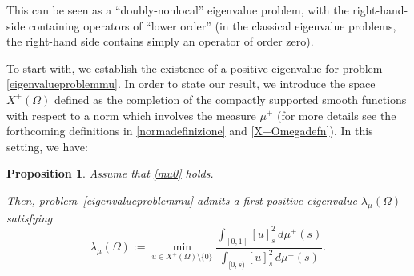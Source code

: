 \documentclass[12pt,a4paper,intlimits,sumlimits]{amsart}
\theoremstyle{definition}
\theoremstyle{plain}
\newtheorem{proposition}[definition]{Proposition}
\numberwithin{equation}{section}
\begin{document}
This can be seen as a ``doubly-nonlocal'' eigenvalue problem,
with the right-hand-side containing operators of ``lower order''
(in the classical eigenvalue problems, the right-hand side contains
simply an operator of order zero).

To start with, we establish the existence of a positive eigenvalue for problem \eqref{eigenvalueproblemmu}. In order to state our result, we introduce the space $X^+(\Omega)$ defined as the completion
of the compactly supported smooth functions with respect to a norm which involves the measure $\mu^+$ (for more details see the forthcoming definitions in \eqref{normadefinizione} and \eqref{X+Omegadefn}). In this setting, we have:

\begin{proposition}\label{lambda1}
Assume that \eqref{mu0} holds.%

Then, problem~\eqref{eigenvalueproblemmu} admits a first
positive eigenvalue $\lambda_{\mu}(\Omega)$ satisfying
\begin{equation}\label{lambdamuOmega}
\lambda_{\mu}(\Omega):= \min_{u\in X^+(\Omega)\setminus\{0\}} \dfrac{\displaystyle\int_{[0, 1]} [u]^2_s \, d\mu^+(s)}{\displaystyle \int_{[0, \overline{s})} [u]^2_s \, d\mu^-(s)}.
\end{equation}
\end{proposition}
\end{document}
